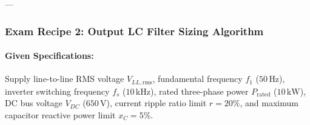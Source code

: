 ---

\subsubsection{Exam Recipe 2: Output LC Filter Sizing Algorithm}
\paragraph{Given Specifications:}
Supply line-to-line RMS voltage $V_{LL,\mathrm{rms}}$, fundamental frequency $f_1$ ($50\,\si{\hertz}$), inverter switching frequency $f_s$ ($10\,\si{\kilo\hertz}$), rated three-phase power $P_{\mathrm{rated}}$ ($10\,\si{\kilo\watt}$), DC bus voltage $V_{DC}$ ($650\,\si{\volt}$), current ripple ratio limit $r = 20\%$, and maximum capacitor reactive power limit $x_C = 5\%$.

